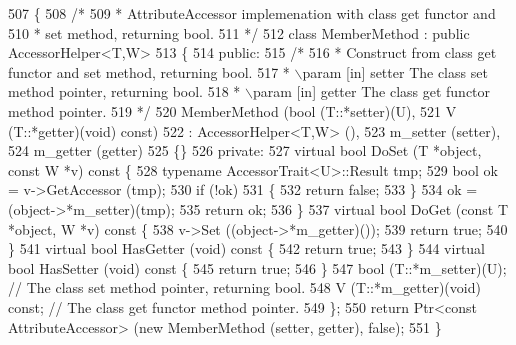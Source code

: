 \begin{DoxyCode}
507 \{
508   \textcolor{comment}{/*}
509 \textcolor{comment}{   * AttributeAccessor implemenation with class get functor and}
510 \textcolor{comment}{   * set method, returning bool.}
511 \textcolor{comment}{   */}
512   \textcolor{keyword}{class }MemberMethod : \textcolor{keyword}{public} AccessorHelper<T,W>
513   \{
514 \textcolor{keyword}{public}:
515     \textcolor{comment}{/*}
516 \textcolor{comment}{     * Construct from class get functor and set method, returning bool.}
517 \textcolor{comment}{     * \(\backslash\)param [in] setter The class set method pointer, returning bool.}
518 \textcolor{comment}{     * \(\backslash\)param [in] getter The class get functor method pointer.}
519 \textcolor{comment}{     */}
520     MemberMethod (\textcolor{keywordtype}{bool} (T::*setter)(U),
521                   V (T::*getter)(\textcolor{keywordtype}{void}) \textcolor{keyword}{const})
522       : AccessorHelper<T,W> (),
523         m\_setter (setter),
524         m\_getter (getter)
525     \{\}
526 \textcolor{keyword}{private}:
527     \textcolor{keyword}{virtual} \textcolor{keywordtype}{bool} DoSet (T *\textcolor{keywordtype}{object}, \textcolor{keyword}{const} W *v)\textcolor{keyword}{ const }\{
528       \textcolor{keyword}{typename} AccessorTrait<U>::Result tmp;
529       \textcolor{keywordtype}{bool} ok = v->GetAccessor (tmp);
530       \textcolor{keywordflow}{if} (!ok)
531         \{
532           \textcolor{keywordflow}{return} \textcolor{keyword}{false};
533         \}
534       ok = (\textcolor{keywordtype}{object}->*m\_setter)(tmp);
535       \textcolor{keywordflow}{return} ok;
536     \}
537     \textcolor{keyword}{virtual} \textcolor{keywordtype}{bool} DoGet (\textcolor{keyword}{const} T *\textcolor{keywordtype}{object}, W *v)\textcolor{keyword}{ const }\{
538       v->Set ((object->*m\_getter)());
539       \textcolor{keywordflow}{return} \textcolor{keyword}{true};
540     \}
541     \textcolor{keyword}{virtual} \textcolor{keywordtype}{bool} HasGetter (\textcolor{keywordtype}{void})\textcolor{keyword}{ const }\{
542       \textcolor{keywordflow}{return} \textcolor{keyword}{true};
543     \}
544     \textcolor{keyword}{virtual} \textcolor{keywordtype}{bool} HasSetter (\textcolor{keywordtype}{void})\textcolor{keyword}{ const }\{
545       \textcolor{keywordflow}{return} \textcolor{keyword}{true};
546     \}
547     bool (T::*m\_setter)(U);        \textcolor{comment}{// The class set method pointer, returning bool.}
548     V (T::*m\_getter)(void) \textcolor{keyword}{const};  \textcolor{comment}{// The class get functor method pointer.}
549   \};
550   \textcolor{keywordflow}{return} Ptr<const AttributeAccessor> (\textcolor{keyword}{new} MemberMethod (setter, getter), \textcolor{keyword}{false});
551 \}
\end{DoxyCode}


